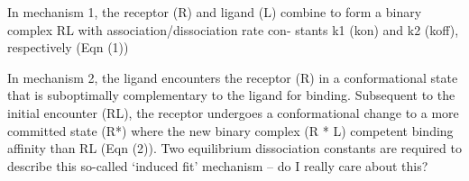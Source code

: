 In mechanism 1, the receptor (R) and ligand (L) combine to form a binary complex RL with association/dissociation rate con- stants k1 (kon) and k2 (koff), respectively (Eqn (1))

In mechanism 2, the ligand encounters the receptor (R) in a conformational state that is suboptimally complementary to the ligand for binding. Subsequent to the initial encounter (RL), the receptor undergoes a conformational change to a more committed state (R*) where the new binary complex (R * L) competent binding affinity than RL (Eqn (2)).
Two equilibrium dissociation constants are required to describe this so-called ‘induced fit’ mechanism -- do I really care about this?





